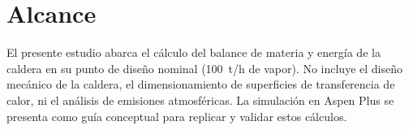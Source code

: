 \section{Alcance}

El presente estudio abarca el cálculo del balance de materia y energía de la caldera en su punto de diseño nominal (100~t/h de vapor). No incluye el diseño mecánico de la caldera, el dimensionamiento de superficies de transferencia de calor, ni el análisis de emisiones atmosféricas. La simulación en Aspen Plus se presenta como guía conceptual para replicar y validar estos cálculos.
